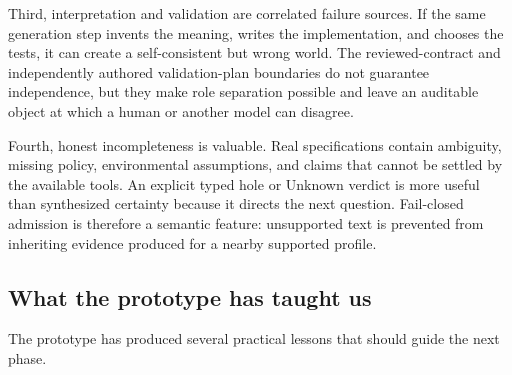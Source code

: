 \documentclass[11pt]{article}
\begin{document}
Third, interpretation and validation are correlated failure sources.  If the
same generation step invents the meaning, writes the implementation, and
chooses the tests, it can create a self-consistent but wrong world.  The
reviewed-contract and independently authored validation-plan boundaries do
not guarantee independence, but they make role separation possible and leave
an auditable object at which a human or another model can disagree.

Fourth, honest incompleteness is valuable.  Real specifications contain
ambiguity, missing policy, environmental assumptions, and claims that cannot
be settled by the available tools.  An explicit typed hole or Unknown verdict
is more useful than synthesized certainty because it directs the next
question.  Fail-closed admission is therefore a semantic feature: unsupported
text is prevented from inheriting evidence produced for a nearby supported
profile.

\subsection{What the prototype has taught us}

The prototype has produced several practical lessons that should guide the
next phase.
\end{document}
